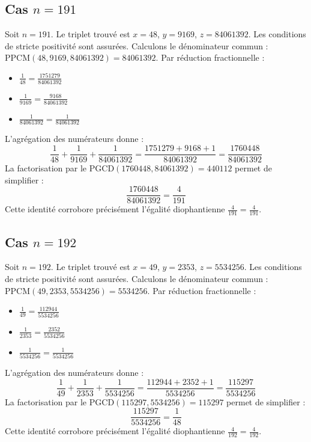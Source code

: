 \documentclass[11pt,a4paper]{article}
\begin{document}
\subsection{Cas $n = 191$}
Soit $n = 191$. Le triplet trouvé est $x = 48$, $y = 9169$, $z = 84061392$.
Les conditions de stricte positivité sont assurées.
Calculons le dénominateur commun : $\text{PPCM}(48, 9169, 84061392) = 84061392$.
Par réduction fractionnelle :
\begin{itemize}
    \item $\frac{1}{48} = \frac{1751279}{84061392}$
    \item $\frac{1}{9169} = \frac{9168}{84061392}$
    \item $\frac{1}{84061392} = \frac{1}{84061392}$
\end{itemize}
L'agrégation des numérateurs donne :
$$ \frac{1}{48} + \frac{1}{9169} + \frac{1}{84061392} = \frac{1751279 + 9168 + 1}{84061392} = \frac{1760448}{84061392} $$
La factorisation par le $\text{PGCD}(1760448, 84061392) = 440112$ permet de simplifier :
$$ \frac{1760448}{84061392} = \frac{4}{191} $$
Cette identité corrobore précisément l'égalité diophantienne $\frac{4}{191} = \frac{4}{191}$.

\subsection{Cas $n = 192$}
Soit $n = 192$. Le triplet trouvé est $x = 49$, $y = 2353$, $z = 5534256$.
Les conditions de stricte positivité sont assurées.
Calculons le dénominateur commun : $\text{PPCM}(49, 2353, 5534256) = 5534256$.
Par réduction fractionnelle :
\begin{itemize}
    \item $\frac{1}{49} = \frac{112944}{5534256}$
    \item $\frac{1}{2353} = \frac{2352}{5534256}$
    \item $\frac{1}{5534256} = \frac{1}{5534256}$
\end{itemize}
L'agrégation des numérateurs donne :
$$ \frac{1}{49} + \frac{1}{2353} + \frac{1}{5534256} = \frac{112944 + 2352 + 1}{5534256} = \frac{115297}{5534256} $$
La factorisation par le $\text{PGCD}(115297, 5534256) = 115297$ permet de simplifier :
$$ \frac{115297}{5534256} = \frac{1}{48} $$
Cette identité corrobore précisément l'égalité diophantienne $\frac{4}{192} = \frac{4}{192}$.
\end{document}
